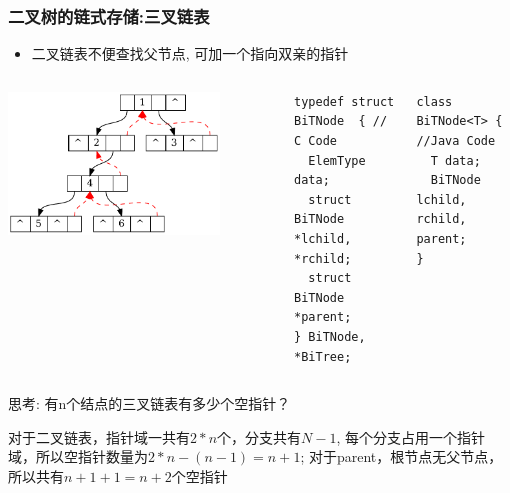 \begin{frame}[fragile]
  \frametitle{二叉树的链式存储:三叉链表}
  \begin{itemize}
  \item 二叉链表不便查找父节点, 可加一个指向双亲的指针
  \end{itemize}

  \begin{columns}[T]
    \includegraphics[width=0.8\textwidth]{dot/tree-store-trilink.pdf}
    
    \begin{verbatim}
typedef struct BiTNode  { // C Code
  ElemType data;
  struct BiTNode *lchild, *rchild;
  struct BiTNode *parent;
} BiTNode, *BiTree;
    \end{verbatim}

    \begin{verbatim}
class BiTNode<T> { //Java Code
  T data;
  BiTNode lchild, rchild, parent;
}
    \end{verbatim}
  \end{columns}

  \small 思考: 有n个结点的三叉链表有多少个空指针？

  \pause
  \scriptsize
  对于二叉链表，指针域一共有$2*n$个，分支共有$N-1$,  每个分支占用一个指针域，所以空指针数量为$2*n - (n - 1) = n+1 $;  对于parent，根节点无父节点，所以共有$n+1+1=n+2$个空指针
\end{frame}


\begin{frame}
  ~  
\end{frame}


